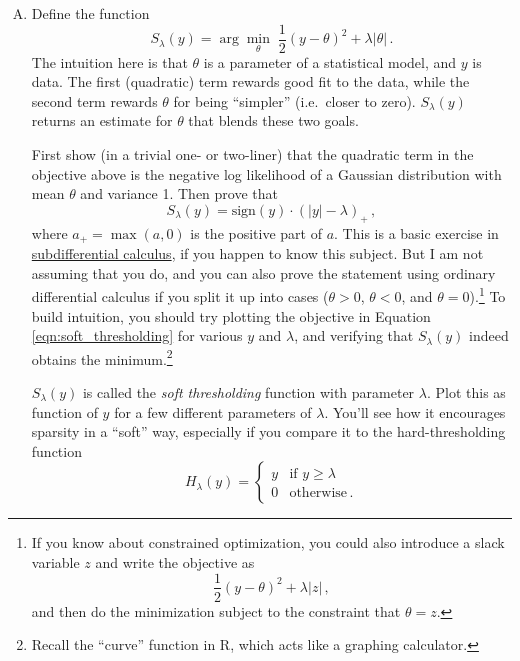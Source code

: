 \documentclass{article}
\begin{document}
\begin{enumerate}[(A)]
\item Define the function
\begin{equation}
\label{eqn:soft_thresholding}
S_\lambda(y) = \arg \min_{\theta} \; \frac{1}{2}(y - \theta)^2 + \lambda | \theta | \, .
\end{equation}
The intuition here is that $\theta$ is a parameter of a statistical model, and $y$ is data.   The first (quadratic) term rewards good fit to the data, while the second term rewards $\theta$ for being ``simpler'' (i.e.~closer to zero).  $S_\lambda(y)$ returns an estimate for $\theta$ that blends these two goals.

First show (in a trivial one- or two-liner) that the quadratic term in the objective above is the negative log likelihood of a Gaussian distribution with mean $\theta$ and variance 1.  Then prove that 
$$
S_\lambda(y) = \mbox{sign}(y) \cdot (|y| - \lambda)_+ \, ,
$$
where $a_+ = \max(a,0)$ is the positive part of $a$.  This is a basic exercise in \href{http://ocw.mit.edu/courses/electrical-engineering-and-computer-science/6-253-convex-analysis-and-optimization-spring-2012/lecture-notes/MIT6_253S12_lec12.pdf}{subdifferential calculus}, if you happen to know this subject.  But I am not assuming that you do, and you can also prove the statement using ordinary differential calculus if you split it up into cases ($\theta>0$, $\theta<0$, and $\theta=0$).\footnote[][-5pc]{If you know about constrained optimization, you could also introduce a slack variable $z$ and write the objective as
$$
\frac{1}{2}(y - \theta)^2 + \lambda | z | \, ,
$$
and then do the minimization subject to the constraint that $\theta = z$.}  To build intuition, you should try plotting the objective in Equation \ref{eqn:soft_thresholding} for various $y$ and $\lambda$, and verifying that $S_\lambda(y)$ indeed obtains the minimum.\footnote{Recall the ``curve'' function in R, which acts like a graphing calculator.}

$S_\lambda(y)$ is called the \textit{soft thresholding} function with parameter $\lambda$.  Plot this as function of $y$ for a few different parameters of $\lambda$.  You'll see how it encourages sparsity in a ``soft'' way, especially if you compare it to the hard-thresholding function
$$
H_{\lambda}(y) = 
\left \{
\begin{array}{ll}
y & \mbox{if $y \geq \lambda$} \\
0 & \mbox{otherwise} \, .
\end{array}
\right.
$$



\end{enumerate}
\end{document}

